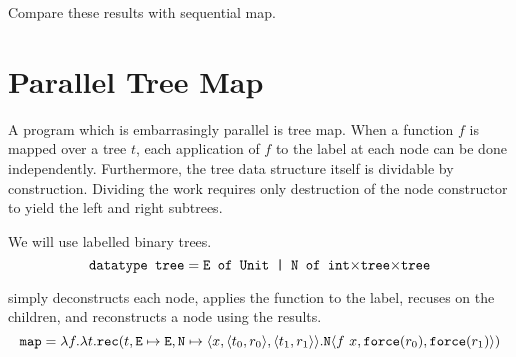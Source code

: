 Compare these results with sequential map.


\section{Parallel Tree Map}
A program which is embarrasingly parallel is tree map.
When a function $f$ is mapped over a tree $t$, each application of $f$ to the label at each node can be done independently.
Furthermore, the tree data structure itself is dividable by construction.
Dividing the work requires only destruction of the node constructor to yield the left and right subtrees.

We will use  labelled binary trees.
\begin{equation*}
  \texttt{datatype tree} = \texttt{E of Unit | N of int$\times$tree$\times$tree}
\end{equation*}

 simply deconstructs each node, applies the function to the label, recuses on the children, and reconstructs a node using the results.
\begin{equation*}
  \texttt{map} = \lambda f.\lambda t.\texttt{rec}(t, \texttt{E} \mapsto \texttt{E}, \texttt{N} \mapsto \langle x, \langle t_0, r_0 \rangle, \langle t_1, r_1 \rangle\rangle.\texttt{N} \langle f\ x, \texttt{force}(r_0), \texttt{force}(r_1)\rangle)
\end{equation*}

